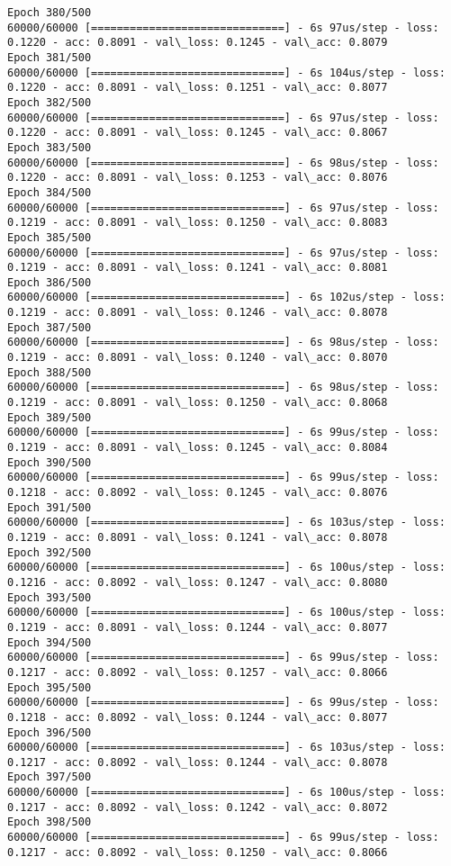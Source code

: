 \documentclass[11pt]{article}
\begin{document}
\begin{Verbatim}[commandchars=\\\{\}]
Epoch 380/500
60000/60000 [==============================] - 6s 97us/step - loss: 0.1220 - acc: 0.8091 - val\_loss: 0.1245 - val\_acc: 0.8079
Epoch 381/500
60000/60000 [==============================] - 6s 104us/step - loss: 0.1220 - acc: 0.8091 - val\_loss: 0.1251 - val\_acc: 0.8077
Epoch 382/500
60000/60000 [==============================] - 6s 97us/step - loss: 0.1220 - acc: 0.8091 - val\_loss: 0.1245 - val\_acc: 0.8067
Epoch 383/500
60000/60000 [==============================] - 6s 98us/step - loss: 0.1220 - acc: 0.8091 - val\_loss: 0.1253 - val\_acc: 0.8076
Epoch 384/500
60000/60000 [==============================] - 6s 97us/step - loss: 0.1219 - acc: 0.8091 - val\_loss: 0.1250 - val\_acc: 0.8083
Epoch 385/500
60000/60000 [==============================] - 6s 97us/step - loss: 0.1219 - acc: 0.8091 - val\_loss: 0.1241 - val\_acc: 0.8081
Epoch 386/500
60000/60000 [==============================] - 6s 102us/step - loss: 0.1219 - acc: 0.8091 - val\_loss: 0.1246 - val\_acc: 0.8078
Epoch 387/500
60000/60000 [==============================] - 6s 98us/step - loss: 0.1219 - acc: 0.8091 - val\_loss: 0.1240 - val\_acc: 0.8070
Epoch 388/500
60000/60000 [==============================] - 6s 98us/step - loss: 0.1219 - acc: 0.8091 - val\_loss: 0.1250 - val\_acc: 0.8068
Epoch 389/500
60000/60000 [==============================] - 6s 99us/step - loss: 0.1219 - acc: 0.8091 - val\_loss: 0.1245 - val\_acc: 0.8084
Epoch 390/500
60000/60000 [==============================] - 6s 99us/step - loss: 0.1218 - acc: 0.8092 - val\_loss: 0.1245 - val\_acc: 0.8076
Epoch 391/500
60000/60000 [==============================] - 6s 103us/step - loss: 0.1219 - acc: 0.8091 - val\_loss: 0.1241 - val\_acc: 0.8078
Epoch 392/500
60000/60000 [==============================] - 6s 100us/step - loss: 0.1216 - acc: 0.8092 - val\_loss: 0.1247 - val\_acc: 0.8080
Epoch 393/500
60000/60000 [==============================] - 6s 100us/step - loss: 0.1219 - acc: 0.8091 - val\_loss: 0.1244 - val\_acc: 0.8077
Epoch 394/500
60000/60000 [==============================] - 6s 99us/step - loss: 0.1217 - acc: 0.8092 - val\_loss: 0.1257 - val\_acc: 0.8066
Epoch 395/500
60000/60000 [==============================] - 6s 99us/step - loss: 0.1218 - acc: 0.8092 - val\_loss: 0.1244 - val\_acc: 0.8077
Epoch 396/500
60000/60000 [==============================] - 6s 103us/step - loss: 0.1217 - acc: 0.8092 - val\_loss: 0.1244 - val\_acc: 0.8078
Epoch 397/500
60000/60000 [==============================] - 6s 100us/step - loss: 0.1217 - acc: 0.8092 - val\_loss: 0.1242 - val\_acc: 0.8072
Epoch 398/500
60000/60000 [==============================] - 6s 99us/step - loss: 0.1217 - acc: 0.8092 - val\_loss: 0.1250 - val\_acc: 0.8066

\end{Verbatim}
\end{document}

